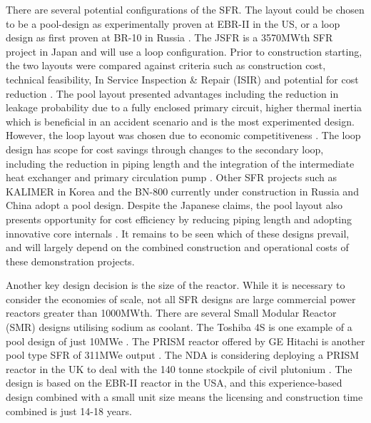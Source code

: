 \documentclass[journal]{IEEEtran}
\begin{document}
There are several potential configurations of the SFR. 
The layout could be chosen to be a pool-design as experimentally proven at EBR-II in the US, or a loop design as first proven at BR-10 in Russia \cite{Int2012}. 
The JSFR is a 3570MWth SFR project in Japan and will use a loop configuration. 
Prior to construction starting, the two layouts were compared against criteria such as construction cost, technical feasibility, In Service Inspection \& Repair (ISIR) and potential for cost reduction \cite{Sakamoto2013194}.
The pool layout presented advantages including the reduction in leakage probability due to a fully enclosed primary circuit, higher thermal inertia which is beneficial in an accident scenario and is the most experimented design.
However, the loop layout was chosen due to economic competitiveness \cite{Locatelli2013}. 
The loop design has scope for cost savings through changes to the secondary loop, including the reduction in piping length and the integration of the intermediate heat exchanger and primary circulation pump \cite{Sakamoto2013194}. 
Other SFR projects such as KALIMER in Korea and the BN-800 currently under construction in Russia and China adopt a pool design. 
Despite the Japanese claims, the pool layout also presents opportunity for cost efficiency by reducing piping length and adopting innovative core internals \cite{Locatelli2013}. 
It remains to be seen which of these designs prevail, and will largely depend on the combined construction and operational costs of these demonstration projects.

Another key design decision is the size of the reactor. 
While it is necessary to consider the economies of scale, not all SFR designs are large commercial power reactors greater than 1000MWth.
There are several Small Modular Reactor (SMR) designs utilising sodium as coolant.
The Toshiba 4S is one example of a pool design of just 10MWe \cite{Locatelli2013}. 
The PRISM reactor offered by GE Hitachi is another pool type SFR of 311MWe output \cite{Locatelli2013}. 
The NDA is considering deploying a PRISM reactor in the UK to deal with the 140 tonne stockpile of civil plutonium \cite{NDA14}. 
The design is based on the EBR-II reactor in the USA, and this experience-based design combined with a small unit size means the licensing and construction time combined is just 14-18 years\cite{NDA14}.
\end{document}
